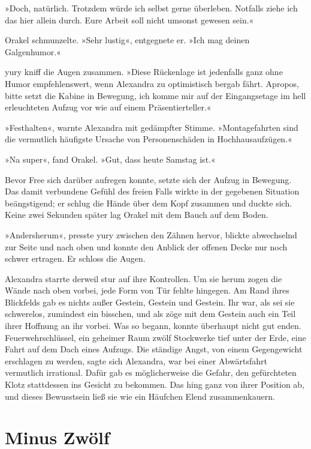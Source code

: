 »Doch, natürlich. Trotzdem würde ich selbst gerne überleben. Notfalls ziehe ich das hier allein durch. Eure Arbeit soll nicht umsonst gewesen sein.«

Orakel schmunzelte. »Sehr lustig«, entgegnete er. »Ich mag deinen Galgenhumor.«

yury kniff die Augen zusammen. »Diese Rückenlage ist jedenfalls ganz ohne Humor empfehlenswert, wenn Alexandra zu optimistisch bergab fährt. Apropos, bitte setzt die Kabine in Bewegung, ich komme mir auf der Eingangsetage im hell erleuchteten Aufzug vor wie auf einem Präsentierteller.«

»Festhalten«, warnte Alexandra mit gedämpfter Stimme. »Montagefahrten sind die vermutlich häufigste Ursache von Personenschäden in Hochhausaufzügen.«

»Na super«, fand Orakel. »Gut, dass heute Samstag ist.«

Bevor Free sich darüber aufregen konnte, setzte sich der Aufzug in Bewegung. Das damit verbundene Gefühl des freien Falls wirkte in der gegebenen Situation beängstigend; er schlug die Hände über dem Kopf zusammen und duckte sich. Keine zwei Sekunden später lag Orakel mit dem Bauch auf dem Boden.

»Andersherum«, presste yury zwischen den Zähnen hervor, blickte abwechselnd zur Seite und nach oben und konnte den Anblick der offenen Decke nur noch schwer ertragen. Er schloss die Augen.

Alexandra starrte derweil stur auf ihre Kontrollen. Um sie herum zogen die Wände nach oben vorbei, jede Form von Tür fehlte hingegen. Am Rand ihres Blickfelds gab es nichts außer Gestein, Gestein und Gestein. Ihr war, als sei sie schwerelos, zumindest ein bisschen, und als zöge mit dem Gestein auch ein Teil ihrer Hoffnung an ihr vorbei. Was so begann, konnte überhaupt nicht gut enden. Feuerwehrschlüssel, ein geheimer Raum zwölf Stockwerke tief unter der Erde, eine Fahrt auf dem Dach eines Aufzugs. Die ständige Angst, von einem Gegengewicht erschlagen zu werden, sagte sich Alexandra, war bei einer Abwärtsfahrt vermutlich irrational. Dafür gab es möglicherweise die Gefahr, den gefürchteten Klotz stattdessen ins Gesicht zu bekommen. Das hing ganz von ihrer Position ab, und dieses Bewusstsein ließ sie wie ein Häufchen Elend zusammenkauern.


\chapter{Minus Zwölf}

